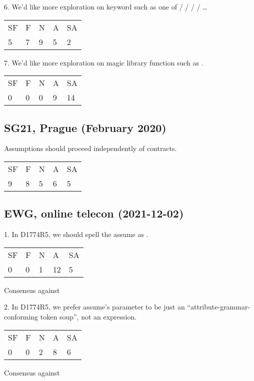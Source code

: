 6. We’d like more exploration on keyword such as one of  /  /  /  / …

\hspace{6mm}
\begin{tabular}{lllll}
SF & F & N & A & SA \\
5 & 7 & 9 & 5 & 2
\end{tabular}

7. We’d like more exploration on magic library function such as .

\hspace{6mm}
\begin{tabular}{lllll}
SF & F & N & A & SA \\
0 & 0 & 0 & 9 & 14
\end{tabular}

\subsection*{SG21, Prague (February 2020)}

Assumptions should proceed independently of contracts.

\hspace{6mm}
\begin{tabular}{lllll}
SF & F & N & A & SA \\
9 & 8 & 5 & 6 & 5
\end{tabular}

\subsection*{EWG, online telecon (2021-12-02)}

1. In D1774R5, we should spell the assume as .

\hspace{6mm}
\begin{tabular}{lllll}
SF & F & N & A & SA \\
0 & 0 & 1 & 12 & 5
\end{tabular}
\hspace{5mm}Consensus against

2. In D1774R5, we prefer assume’s parameter to be just an “attribute-grammar-conforming token soup”, not an expression.

\hspace{6mm}
\begin{tabular}{lllll}
SF & F & N & A & SA \\
0 & 0 & 2 & 8 & 6
\end{tabular}
\hspace{5mm}Consensus against

